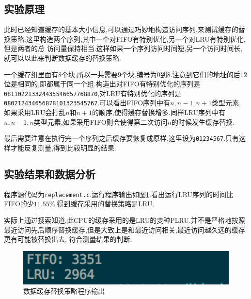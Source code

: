 \documentclass[adobefonts, nocap]{ctexart}
\begin{document}
    \subsection{实验原理}
      此时已经知道缓存的基本大小信息,可以通过巧妙地构造访问序列,来测试缓存的替换策略.这里构造两个序列,其中一个对FIFO有特别优化,另一个对LRU有特别优化,但是两者的总
      访问量保持相当.这样如果一个序列访问时间短,另一个访问时间长,就可以以此来判断数据缓存的替换策略.

      一个缓存组里面有$8$个块,所以一共需要$9$个块,编号为$0$到$8$.注意到它们的地址的后$12$位是相同的,即都属于同一个组.构造出对FIFO有特别优化的序列是\texttt{081102213324435546657768870},对LRU有特别优化的序列是\texttt{080212434656878101323545767}.可以看出FIFO序列中有$n,n-1,n+1$类型元素,
      如果采用LRU会打乱$n$和$n+1$的顺序,使得缓存替换增多.同样LRU序列中有$n,n-1,n$类型元素,如果采用FIFO则会使得第二次访问$n$的时候发生缓存替换.

      最后需要注意在执行完一个序列之后缓存要恢复成原样,这里设为\texttt{01234567}.只有这样才能反复测量,得到比较明显的结果.
    \subsection{实验结果和数据分析}
      程序源代码为\texttt{replacement.c}.运行程序输出如图\ref{fig8}.看出运行LRU序列的时间比FIFO的少$11.55\%$,得到缓存采用的替换策略是LRU.

      实际上通过搜索知道,此CPU的缓存采用的是LRU的变种PLRU.并不是严格地按照最近访问先后顺序替换缓存,但是大致上是和最近访问相关,最近访问越久远的缓存更有可能被替换出去,
      符合测量结果的判断.

      \begin{figure}[htbp]
        \includegraphics[width=12cm]{8.png}
        \caption{数据缓存替换策略程序输出}
        \label{fig8}
      \end{figure}
\end{document}
